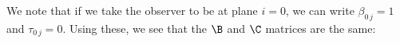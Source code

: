 We note that if we take the observer to be at plane $i =0$, we can write $\beta_{0\,j} = 1$ and $\tau_{0\,j} = 0$. Using these, we see that the $\B$ and $\C$ matrices are the same:
  